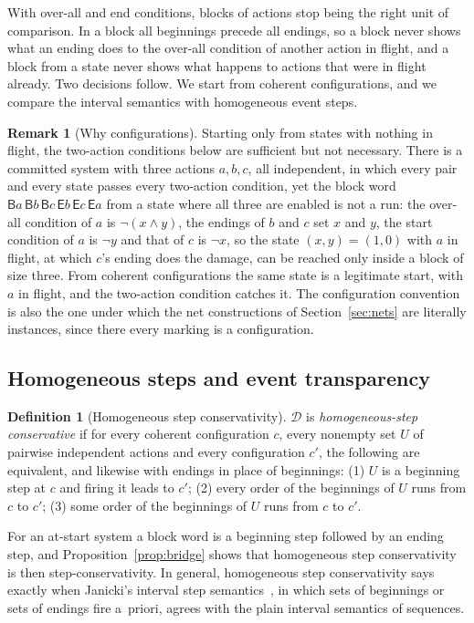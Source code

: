 \documentclass[preprint,12pt]{elsarticle}
\theoremstyle{plain}
\theoremstyle{definition}
\newtheorem{definition}[theorem]{Definition}
\newtheorem{remark}[theorem]{Remark}
\newcommand{\B}[1]{\mathsf{B}#1}
\newcommand{\E}[1]{\mathsf{E}#1}
\newcommand{\D}{\mathcal{D}}
\begin{document}
With over-all and end conditions, blocks of actions stop being the right unit of comparison. In a block all beginnings precede all endings, so a block never shows what an ending does to the over-all condition of another action in flight, and a block from a state never shows what happens to actions that were in flight already. Two decisions follow. We start from coherent configurations, and we compare the interval semantics with homogeneous event steps.

\begin{remark}[Why configurations]
\label{rem:states}
Starting only from states with nothing in flight, the two-action conditions below are sufficient but not necessary. There is a committed system with three actions $a, b, c$, all independent, in which every pair and every state passes every two-action condition, yet the block word $\B{a}\,\B{b}\,\B{c}\,\E{b}\,\E{c}\,\E{a}$ from a state where all three are enabled is not a run: the over-all condition of $a$ is $\neg(x \wedge y)$, the endings of $b$ and $c$ set $x$ and $y$, the start condition of $a$ is $\neg y$ and that of $c$ is $\neg x$, so the state $(x, y) = (1, 0)$ with $a$ in flight, at which $c$'s ending does the damage, can be reached only inside a block of size three. From coherent configurations the same state is a legitimate start, with $a$ in flight, and the two-action condition catches it. The configuration convention is also the one under which the net constructions of Section~\ref{sec:nets} are literally instances, since there every marking is a configuration.
\end{remark}

\subsection{Homogeneous steps and event transparency}

\begin{definition}[Homogeneous step conservativity]
\label{def:hsc}
$\D$ is \emph{homogeneous-step conservative} if for every coherent configuration $c$, every nonempty set $U$ of pairwise independent actions and every configuration $c'$, the following are equivalent, and likewise with endings in place of beginnings:
(1) $U$ is a beginning step at $c$ and firing it leads to $c'$;
(2) every order of the beginnings of $U$ runs from $c$ to $c'$;
(3) some order of the beginnings of $U$ runs from $c$ to $c'$.
\end{definition}

For an at-start system a block word is a beginning step followed by an ending step, and Proposition~\ref{prop:bridge} shows that homogeneous step conservativity is then step-conservativity. In general, homogeneous step conservativity says exactly when Janicki's interval step semantics~\cite{Janicki2019}, in which sets of beginnings or sets of endings fire a~priori, agrees with the plain interval semantics of sequences.
\end{document}
